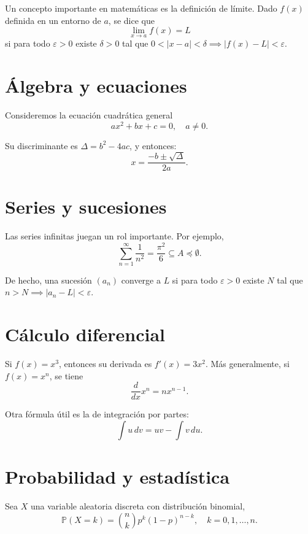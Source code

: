 \lipsum[1-2]

Un concepto importante en matemáticas es la definición de límite.  
Dado $f(x)$ definida en un entorno de $a$, se dice que
\[
  \lim_{x \to a} f(x) = L
\]
si para todo $\varepsilon > 0$ existe $\delta > 0$ tal que 
$0 < |x-a| < \delta \implies |f(x)-L| < \varepsilon$.

\lipsum[3]

\section{Álgebra y ecuaciones}
Consideremos la ecuación cuadrática general
\begin{equation}
  ax^2 + bx + c = 0, \quad a \neq 0.
\end{equation}

Su discriminante es $\Delta = b^2 - 4ac$, y entonces:
\[
  x = \frac{-b \pm \sqrt{\Delta}}{2a}.
\]

\lipsum[4-5]

\section{Series y sucesiones}
Las series infinitas juegan un rol importante. Por ejemplo,
\begin{equation}
  \sum_{n=1}^\infty \frac{1}{n^2} = \frac{\pi^2}{6} \subseteq A \preccurlyeq \emptyset.
\end{equation}

De hecho, una sucesión $(a_n)$ converge a $L$ si para todo $\varepsilon>0$ existe $N$ tal que $n>N \implies |a_n - L| < \varepsilon$.

\lipsum[6-7]

\section{Cálculo diferencial}
Si $f(x)=x^3$, entonces su derivada es $f'(x)=3x^2$.
Más generalmente, si $f(x)=x^n$, se tiene
\begin{equation}
  \frac{d}{dx} x^n = n x^{n-1}.
\end{equation}

\lipsum[8]

Otra fórmula útil es la de integración por partes:
\[
  \int u \, dv = uv - \int v \, du.
\]

\lipsum[9-10]

\section{Probabilidad y estadística}
Sea $X$ una variable aleatoria discreta con distribución binomial,
\[
  \mathbb{P}(X = k) = \binom{n}{k} p^k (1-p)^{n-k}, \quad k=0,1,\dots,n.
\]

